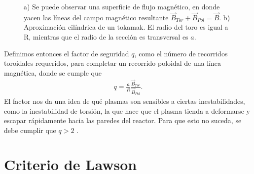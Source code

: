 \documentclass[../main.tex]{subfiles}
\begin{document}
    \begin{figure}[hbtp]
        \caption{a) Se puede observar una superficie de flujo magnético, en donde yacen las líneas del campo magnético resultante $\vec{B}_{Tor} + \vec{B}_{Pol} = \vec B$. b) Aproximación cilíndrica de un tokamak. El radio del toro es igual a R, mientras que el radio de la sección es transversal es $a$.} \label{fig:superficie_magnetica}
    \end{figure}
    
    Definimos entonces el factor de seguridad $q$, como el número de recorridos toroidales requeridos, para completar un recorrido poloidal de una línea magnética, donde se cumple que
    \begin{align}
        q = \frac{a}{R}\frac{\vec{B}_{Tor}}{\vec{B}_{Pol}}.
    \end{align}
    El factor nos da una idea de qué plasmas son sensibles a ciertas inestabilidades, como la inestabilidad de torsión, la que hace que el plasma tienda a deformarse y escapar rápidamente hacia las paredes del reactor. Para que esto no suceda, se debe cumplir que $q > 2$ \cite{morse2018fusion}. 
	    
	\section{Criterio de Lawson}
\end{document}

